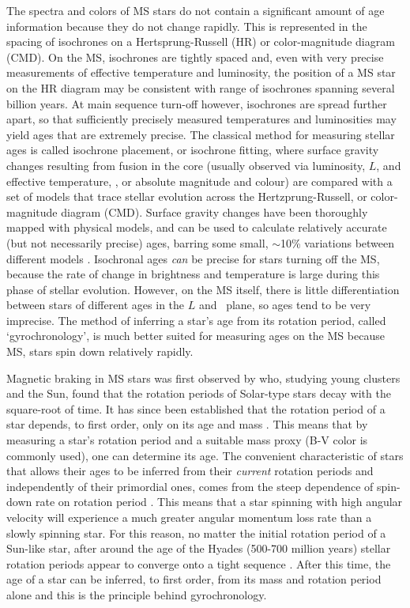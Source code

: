 The spectra and colors of MS stars do not contain a significant amount of age
information because they do not change rapidly.
This is represented in the spacing of isochrones on a Hertsprung-Russell (HR)
or color-magnitude diagram (CMD).
On the MS, isochrones are tightly spaced and, even with very precise
measurements of effective temperature and luminosity, the position of a MS
star on the HR diagram may be consistent with range of isochrones spanning
several billion years.
At main sequence turn-off however, isochrones are spread further apart, so
that sufficiently precisely measured temperatures and luminosities may yield
ages that are extremely precise.
The classical method for measuring stellar ages is called isochrone placement,
or isochrone fitting, where surface gravity changes resulting from fusion in
the core (usually observed via luminosity, $L$, and effective temperature,
\teff, or absolute magnitude and colour) are compared with a set of models
that trace stellar evolution across the Hertzprung-Russell, or color-magnitude
diagram (CMD).
Surface gravity changes have been thoroughly mapped with physical models, and
can be used to calculate relatively accurate (but not necessarily precise)
ages, barring some small, $\sim$10\% variations between different models
\citep[\eg][]{yi2001, dotter2008, dotter2016}.
Isochronal ages {\it can} be precise for stars turning off the MS, because the
rate of change in brightness and temperature is large during this phase of
stellar evolution.
However, on the MS itself, there is little differentiation between stars of
different ages in the $L$ and \teff\ plane, so ages tend to be very imprecise.
The method of inferring a star's age from its rotation period, called
`gyrochronology', is much better suited for measuring ages on the MS because
MS, stars spin down relatively rapidly.

Magnetic braking in MS stars was first observed by \citet{skumanich1972} who,
studying young clusters and the Sun, found that the rotation periods of
Solar-type stars decay with the square-root of time.
It has since been established that the rotation period of a star depends, to
first order, only on its age and mass \citep[\eg][]{barnes2003}.
This means that by measuring a star's rotation period and a suitable mass
proxy (B-V color is commonly used), one can determine its age.
The convenient characteristic of stars that allows their ages to be inferred
from their {\it current} rotation periods and independently of their
primordial ones, comes from the steep dependence of spin-down rate on rotation
period \citep{kawaler1989}.
This means that a star spinning with high angular velocity will experience a
much greater angular momentum loss rate than a slowly spinning star.
For this reason, no matter the initial rotation period of a Sun-like star,
after around the age of the Hyades (500-700 million years) stellar rotation
periods appear to converge onto a tight sequence \citep{irwin2009}.
After this time, the age of a star can be inferred, to first order, from its
mass and rotation period alone and this is the principle behind gyrochronology.

